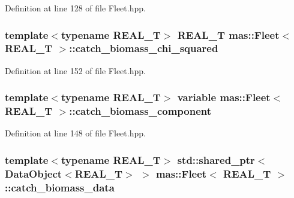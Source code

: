 Definition at line 128 of file Fleet.\-hpp.

\hypertarget{structmas_1_1_fleet_a1dfe358f8efd67a467f70b3a87d49e51}{
\subsubsection[{catch\-\_\-biomass\-\_\-chi\-\_\-squared}]{\setlength{\rightskip}{0pt plus 5cm}template$<$typename R\-E\-A\-L\-\_\-\-T$>$ R\-E\-A\-L\-\_\-\-T {\bf mas\-::\-Fleet}$<$ R\-E\-A\-L\-\_\-\-T $>$\-::catch\-\_\-biomass\-\_\-chi\-\_\-squared}}\label{structmas_1_1_fleet_a1dfe358f8efd67a467f70b3a87d49e51}


Definition at line 152 of file Fleet.\-hpp.

\hypertarget{structmas_1_1_fleet_a205664ab22c0904b56ee4700ae011a8d}{
\subsubsection[{catch\-\_\-biomass\-\_\-component}]{\setlength{\rightskip}{0pt plus 5cm}template$<$typename R\-E\-A\-L\-\_\-\-T$>$ {\bf variable} {\bf mas\-::\-Fleet}$<$ R\-E\-A\-L\-\_\-\-T $>$\-::catch\-\_\-biomass\-\_\-component}}\label{structmas_1_1_fleet_a205664ab22c0904b56ee4700ae011a8d}


Definition at line 148 of file Fleet.\-hpp.

\hypertarget{structmas_1_1_fleet_a996dcf8ffd91799f62cf2421d81eaac0}{
\subsubsection[{catch\-\_\-biomass\-\_\-data}]{\setlength{\rightskip}{0pt plus 5cm}template$<$typename R\-E\-A\-L\-\_\-\-T$>$ std\-::shared\-\_\-ptr$<${\bf Data\-Object}$<$R\-E\-A\-L\-\_\-\-T$>$ $>$ {\bf mas\-::\-Fleet}$<$ R\-E\-A\-L\-\_\-\-T $>$\-::catch\-\_\-biomass\-\_\-data}}\label{structmas_1_1_fleet_a996dcf8ffd91799f62cf2421d81eaac0}


